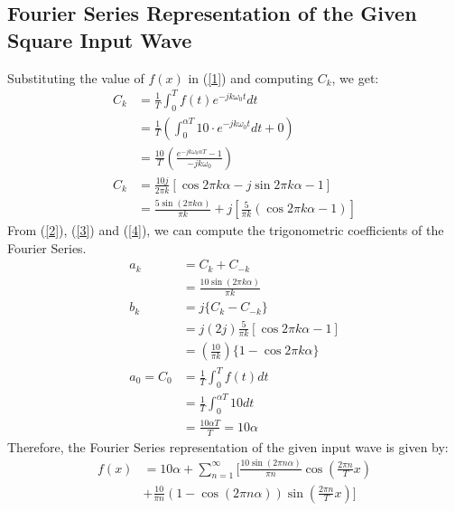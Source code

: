 \begin{multicols}{2}
\subsection{Fourier Series Representation of the Given Square Input Wave}
Substituting the value of $f(x)$ in (\ref{1}) and computing $C_k$, we get:
\begin{align}
C_k &= \frac{1}{T} \int_{0}^{T} f(t) e^{-j k \omega_0 t} dt\\
&= \frac{1}{T} \left( \int_{0}^{\alpha T} 10 \cdot e^{-j k \omega_0 t} dt+ 0\right)\\
&= \frac{10}{T} \left( \frac{e^{-j k \omega_0 \alpha T} - 1}{-j k \omega_0} \right)\\
C_k &= \frac{10 j}{2 \pi k} [\cos 2 \pi k \alpha - j \sin 2 \pi k \alpha - 1]\\ 
&= \frac{5  \sin (2 \pi k \alpha)}{ \pi k} + j \left[ \frac{5}{ \pi k} (\cos 2 \pi k \alpha -1) \right]
\end{align}
From (\ref{2}), (\ref{3}) and (\ref{4}), we can compute the trigonometric coefficients of the Fourier Series.
\begin{align}
a_k &= C_k + C_{-k} \\
&= \frac{10 \sin( 2 \pi k \alpha)}{\pi k} \\
b_k &= j \{ C_k - C_{-k} \} \\
&= j \left( 2 j \right) \frac{5}{ \pi k} [\cos 2 \pi k \alpha - 1]\\
&=\left( \frac{10}{ \pi k} \right) \{1 - \cos 2 \pi k \alpha\}\\
a_0 = C_0 &= \frac{1}{T} \int_{0}^{T} f(t) dt \\
&= \frac{1}{T} \int_{0}^{\alpha T} 10 dt \\
&= \frac{10\alpha T}{T} = 10\alpha
\end{align}
Therefore, the Fourier Series representation of the given input wave is given by: 
\begin{equation}
\begin{split}
f(x) &= 10\alpha + \sum_{n=1}^{\infty} \Bigg[ \frac{10 \sin (2 \pi n \alpha)}{\pi n} \cos\left(\frac{2\pi n}{T} x \right) \\
&+ \frac{10}{\pi n} (1 - \cos (2 \pi n \alpha)) \sin\left(\frac{2\pi n}{T} x \right) \Bigg]
\end{split}
\end{equation}


\end{multicols}

